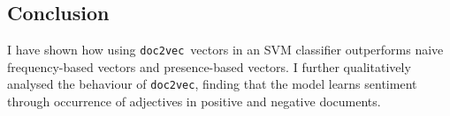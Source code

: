 \documentclass[12pt]{article}
\newcommand{\docvec}{\texttt{doc2vec}}
\begin{document}
\begin{multicols}{2}
\section*{Conclusion}

I have shown how using \docvec~vectors in an SVM classifier outperforms naive frequency-based vectors and presence-based vectors. I further qualitatively analysed the behaviour of \docvec, finding that the model learns sentiment through occurrence of adjectives in positive and negative documents.




\end{multicols}
\end{document}
